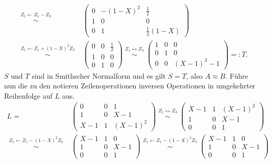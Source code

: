 \documentclass[../../main.tex]{subfiles}
\begin{document}
\begin{bsp}
\begin{align*}
        \stackrel{\begin{smallmatrix}Z_1\leftarrow Z_1-Z_3\end{smallmatrix}}{\sim}&\begin{pmatrix}0&-(1-X)^2&\frac{1}{2}\\1&0&0\\0&1&\frac{1}{2}(1-X)\end{pmatrix}\\
        \stackrel{\begin{smallmatrix}Z_1\leftarrow Z_1+(1-X)^2Z_3\end{smallmatrix}}{\sim}&\begin{pmatrix}0&0&\frac{1}{2}\\1&0&0\\0&1&0\end{pmatrix}
        \stackrel{\begin{smallmatrix}Z_1\leftrightarrow Z_3\end{smallmatrix}}{\sim}\begin{pmatrix}1&0&0\\0&1&0\\0&0&(X-1)^3-1\end{pmatrix}=:T.
    \end{align*}
    $S$ und $T$ sind in Smithscher Normalform und es gilt $S=T$, also $A\approx B$. Führe nun die zu den notieren Zeilenoperationen inversen Operationen in umgekehrter Reihenfolge auf $L$ aus.
    \begin{align*}
        L=&\begin{pmatrix}0&0&1\\1&0&X-1\\X-1&1&(X-1)^2\end{pmatrix}\stackrel{\begin{smallmatrix}Z_1\leftrightarrow Z_3\end{smallmatrix}}{\sim}\begin{pmatrix}X-1&1&(X-1)^2\\1&0&X-1\\0&0&1\end{pmatrix}\\
        \stackrel{\begin{smallmatrix}Z_1\leftarrow Z_1-(1-X)^2Z_3\end{smallmatrix}}{\sim}&\begin{pmatrix}X-1&1&0\\1&0&X-1\\0&0&1\end{pmatrix}\stackrel{\begin{smallmatrix}Z_1\leftarrow Z_1-(1-X)^2Z_3\end{smallmatrix}}{\sim}\begin{pmatrix}X-1&1&0\\1&0&X-1\\0&0&1\end{pmatrix}\\

\end{align*}
\end{bsp}
\end{document}

